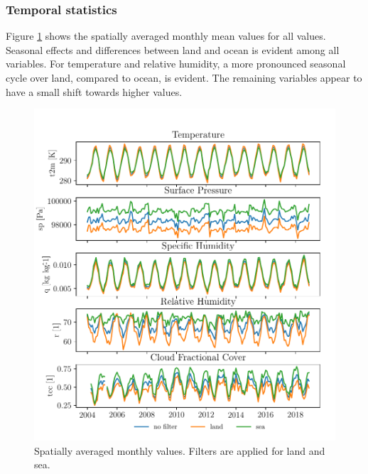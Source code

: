 \subsubsection{Temporal statistics}
Figure \ref{fig:monthly_mean_ts_vars} shows the spatially averaged monthly mean values for all values. Seasonal effects and differences between land and ocean is evident among all variables. For temperature and relative humidity, a more pronounced seasonal cycle over land, compared to ocean, is evident. The remaining variables appear to have a small shift towards higher values.
\begin{figure}[ht]
    \centering
    \includegraphics{python_figs/monthly_means.pdf}
    \caption{Spatially averaged monthly values. Filters are applied for land and sea.}
    \label{fig:monthly_mean_ts_vars}
\end{figure}

